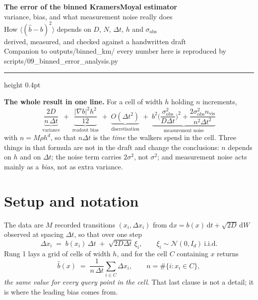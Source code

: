 \documentclass[11pt,a4paper]{article}
\newcommand{\code}[1]{{\ttfamily\small #1}}
\newcommand{\dx}{\Delta x}
\newcommand{\dt}{\Delta t}
\begin{document}
\begin{center}
{\LARGE\bfseries\color{ink} The error of the binned Kramers\textendash Moyal estimator}\\[0.35em]
{\Large\color{accent} variance, bias, and what measurement noise really does}\\[1.0em]
{\color{ink2}\large How $\langle(\hat b-b)^2\rangle$ depends on $D$, $N$, $\dt$, $h$ and
$\sigma_{\mathrm{obs}}$\\ \textemdash{} derived, measured, and checked against a
handwritten draft}\\[1.0em]
{\color{ink3}\small Companion to \code{outputs/binned\_km/} \quad\textbullet\quad
every number here is reproduced by \code{scripts/09\_binned\_error\_analysis.py}}
\end{center}

\vspace{0.4em}
\hrule height 0.4pt \vspace{1.0em}

\begin{keybox}
\textbf{The whole result in one line.} For a cell of width $h$ holding $n$ increments,
\[
  \underbrace{\frac{2D}{n\,\dt}}_{\text{variance}}
  \;+\;\underbrace{\frac{|\nabla b|^{2}h^{2}}{12}}_{\text{readout bias}}
  \;+\;\underbrace{O(\dt^{2})}_{\text{discretisation}}
  \;+\;\underbrace{b^{2}\Big(\frac{\sigma_{\mathrm{obs}}^{2}}{D\dt}\Big)^{2}
        +\frac{2\sigma_{\mathrm{obs}}^{2}n_{\mathrm{vis}}}{n^{2}\dt^{2}}}_{\text{measurement noise}}
\]
with $n=M\rho h^{d}$, so that $n\dt$ is the \emph{time} the walkers spend in the cell.
Three things in that formula are not in the draft and change the conclusions:
$n$ depends on $h$ and on $\dt$; the noise term carries $2\sigma^{2}$, not $\sigma^{2}$;
and measurement noise acts mainly as a \emph{bias}, not as extra variance.
\end{keybox}

\section{Setup and notation}

The data are $M$ recorded transitions $(x_i,\dx_i)$ from
$\mathrm{d}x = b(x)\,\mathrm{d}t+\sqrt{2D}\,\mathrm{d}W$ observed at spacing $\dt$,
so that over one step
\begin{equation}
  \dx_i \;=\; b(x_i)\,\dt \;+\;\sqrt{2D\dt}\,\xi_i ,
  \qquad \xi_i\sim\mathcal N(0,I_d)\ \text{i.i.d.}
  \label{eq:euler}
\end{equation}
Rung 1 lays a grid of cells of width $h$, and for the cell $C$ containing $x$ returns
\begin{equation}
  \hat b(x) \;=\; \frac{1}{n\,\dt}\sum_{i\in C}\dx_i ,
  \qquad n=\#\{i: x_i\in C\} ,
  \label{eq:est}
\end{equation}
\emph{the same value for every query point in the cell}. That last clause is not a
detail; it is where the leading bias comes from.
\end{document}

